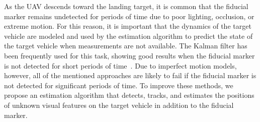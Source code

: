 As the UAV descends toward the landing target, it is common
that the fiducial marker remains undetected
for periods of time due to poor lighting, occlusion, or extreme
motion.
For this reason, it is important that the dynamics of the target vehicle are
modeled and
used by the estimation algorithm to predict the state of the target vehicle
when measurements are not available.
The Kalman filter has been frequently used
for this task, showing good results when the fiducial marker is not detected for
short periods of time~\cite{baca2019autonomous}.
Due to imperfect motion models, however,
all of the mentioned
approaches are likely to fail if the fiducial marker is not detected for
significant periods of time.
To improve these methods, we propose an estimation algorithm that detects,
tracks, and estimates the positions of unknown visual features on the target
vehicle in addition to the fiducial marker.

